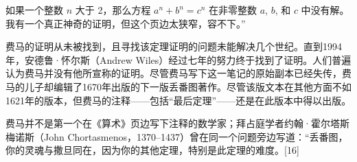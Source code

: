 如果一个整数 \( n \) 大于 2，那么方程 \( a^n + b^n = c^n \) 在非零整数 \( a \), \( b \), 和 \( c \) 中没有解。我有一个真正神奇的证明，但这个页边太狭窄，容不下。”

费马的证明从未被找到，且寻找该定理证明的问题未能解决几个世纪。直到1994年，安德鲁·怀尔斯（Andrew Wiles）经过七年的努力终于找到了证明。人们普遍认为费马并没有他所宣称的证明。尽管费马写下这一笔记的原始副本已经失传，费马的儿子却编辑了1670年出版的下一版丢番图著作。尽管该版文本在其他方面不如1621年的版本，但费马的注释——包括“最后定理”——还是在此版本中得以出版。

费马并不是第一个在《算术》页边写下注释的数学家；拜占庭学者约翰·霍尔塔斯梅诺斯（John Chortasmenos，1370–1437）曾在同一个问题旁边写道：“丢番图，你的灵魂与撒旦同在，因为你的其他定理，特别是此定理的难度。[16]